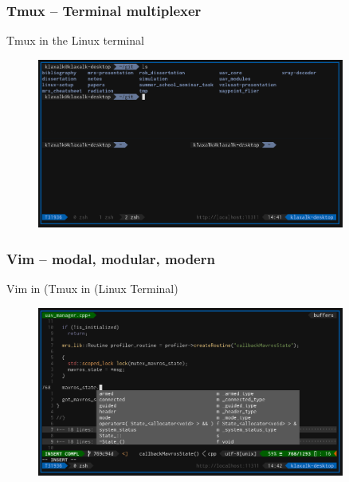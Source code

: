 \documentclass[aspectratio=1610]{beamer}
\begin{document}


\begin{frame}

  \frametitle{Tmux -- Terminal multiplexer}

  \begin{block}{Tmux in the Linux terminal}
    \begin{figure}
      \includegraphics[width=0.9\textwidth]{./fig/tmux.png}
    \end{figure}
  \end{block}

\end{frame}



\begin{frame}
  \frametitle{Vim -- modal, modular, modern}

  \begin{block}{Vim in (Tmux in (Linux Terminal)}
    \begin{figure}
      \includegraphics[width=0.9\textwidth]{./fig/vim.png}
    \end{figure}
  \end{block}

\end{frame}
\end{document}
